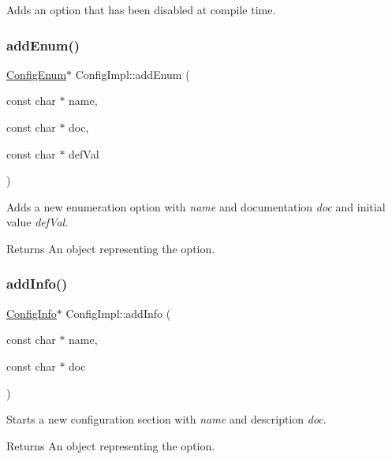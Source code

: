 Adds an option that has been disabled at compile time. \mbox{\label{class_config_impl_a7731299f0826fbb02b6b368a75c801a4}} 
\subsubsection{\texorpdfstring{addEnum()}{addEnum()}}
{\footnotesize\ttfamily \mbox{\hyperlink{class_config_enum}{Config\+Enum}}$\ast$ Config\+Impl\+::add\+Enum (\begin{DoxyParamCaption}\item[{const char $\ast$}]{name,  }\item[{const char $\ast$}]{doc,  }\item[{const char $\ast$}]{def\+Val }\end{DoxyParamCaption})\hspace{0.3cm}{\ttfamily [inline]}}

Adds a new enumeration option with {\itshape name} and documentation {\itshape doc} and initial value {\itshape def\+Val}. \begin{DoxyReturn}{Returns}
An object representing the option. 
\end{DoxyReturn}
\mbox{\label{class_config_impl_af7a7fe31c6efe3e86a2bea7cc547010e}} 
\subsubsection{\texorpdfstring{addInfo()}{addInfo()}}
{\footnotesize\ttfamily \mbox{\hyperlink{class_config_info}{Config\+Info}}$\ast$ Config\+Impl\+::add\+Info (\begin{DoxyParamCaption}\item[{const char $\ast$}]{name,  }\item[{const char $\ast$}]{doc }\end{DoxyParamCaption})\hspace{0.3cm}{\ttfamily [inline]}}

Starts a new configuration section with {\itshape name} and description {\itshape doc}. \begin{DoxyReturn}{Returns}
An object representing the option. 
\end{DoxyReturn}
\mbox{\label{class_config_impl_a420984f55853ed6720b12d1326d986d7}} 
